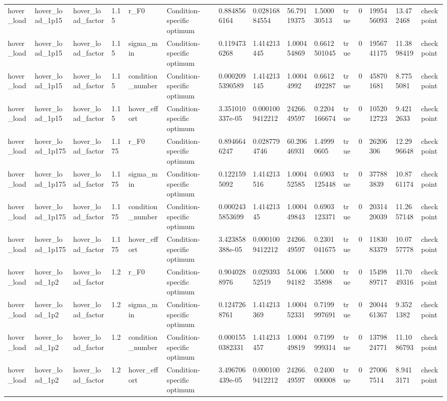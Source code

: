 \begin{tabular}{@{}lllllllllllllll@{}}
hover\_load & hover\_load\_1p15 & hover\_load\_factor & 1.15 & r\_F0 & Condition-specific optimum & 0.8848566164 & 0.02816884554 & 56.79119375 & 1.500030513 & true & 0 & 1995456093 & 13.472468 & checkpoint \\
hover\_load & hover\_load\_1p15 & hover\_load\_factor & 1.15 & sigma\_min & Condition-specific optimum & 0.1194736268 & 1.414213445 & 1.000454869 & 0.6612501045 & true & 0 & 1956741175 & 11.3898419 & checkpoint \\
hover\_load & hover\_load\_1p15 & hover\_load\_factor & 1.15 & condition\_number & Condition-specific optimum & 0.0002095390589 & 1.414213145 & 1.00044992 & 0.6612492287 & true & 0 & 458701681 & 8.7755081 & checkpoint \\
hover\_load & hover\_load\_1p15 & hover\_load\_factor & 1.15 & hover\_effort & Condition-specific optimum & 3.351010337e-05 & 0.0001009412212 & 24266.49597 & 0.2204166674 & true & 0 & 1052012723 & 9.4212633 & checkpoint \\
hover\_load & hover\_load\_1p175 & hover\_load\_factor & 1.175 & r\_F0 & Condition-specific optimum & 0.8946646247 & 0.0287794746 & 60.20646931 & 1.49990605 & true & 0 & 26206306 & 12.2996648 & checkpoint \\
hover\_load & hover\_load\_1p175 & hover\_load\_factor & 1.175 & sigma\_min & Condition-specific optimum & 0.1221595092 & 1.414213516 & 1.000452585 & 0.6903125448 & true & 0 & 377883839 & 10.8761174 & checkpoint \\
hover\_load & hover\_load\_1p175 & hover\_load\_factor & 1.175 & condition\_number & Condition-specific optimum & 0.0002435853699 & 1.41421345 & 1.000449843 & 0.6903123371 & true & 0 & 2031420039 & 11.2657148 & checkpoint \\
hover\_load & hover\_load\_1p175 & hover\_load\_factor & 1.175 & hover\_effort & Condition-specific optimum & 3.423858388e-05 & 0.0001009412212 & 24266.49597 & 0.2301041675 & true & 0 & 1183083379 & 10.0757778 & checkpoint \\
hover\_load & hover\_load\_1p2 & hover\_load\_factor & 1.2 & r\_F0 & Condition-specific optimum & 0.9040288976 & 0.02939352519 & 54.00694182 & 1.500035898 & true & 0 & 1549889717 & 11.7049316 & checkpoint \\
hover\_load & hover\_load\_1p2 & hover\_load\_factor & 1.2 & sigma\_min & Condition-specific optimum & 0.1247268761 & 1.414213369 & 1.000452331 & 0.7199997691 & true & 0 & 2004461367 & 9.3521382 & checkpoint \\
hover\_load & hover\_load\_1p2 & hover\_load\_factor & 1.2 & condition\_number & Condition-specific optimum & 0.0001550382331 & 1.414213457 & 1.000449819 & 0.7199999314 & true & 0 & 1379824771 & 11.1086793 & checkpoint \\
hover\_load & hover\_load\_1p2 & hover\_load\_factor & 1.2 & hover\_effort & Condition-specific optimum & 3.496706439e-05 & 0.0001009412212 & 24266.49597 & 0.2400000008 & true & 0 & 270067514 & 8.9413171 & checkpoint \\
\bottomrule
\end{tabular}
